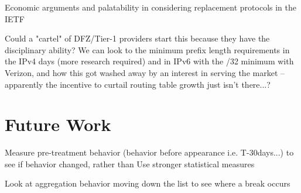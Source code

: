 Economic arguments and palatability in considering replacement protocols in the IETF

Could a "cartel" of DFZ/Tier-1 providers start this because they have the disciplinary ability? We can look to the minimum prefix length requirements in the IPv4 days (more research required) and in IPv6 with the /32 minimum with Verizon, and how this got washed away by an interest in serving the market -- apparently the incentive to curtail routing table growth just isn't there...?

\section{Future Work}
Measure pre-treatment behavior (behavior before appearance i.e. T-30days...) to see if behavior changed, rather than
Use stronger statistical measures

Look at aggregation behavior moving down the list to see where a break occurs